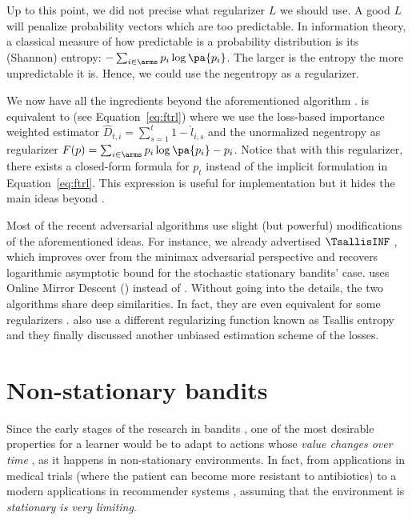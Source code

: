 {Up to this point, we did not precise what regularizer $L$ we should use. A good $L$ will penalize probability vectors which are too predictable. In information theory, a classical measure of how predictable is a probability distribution is its (Shannon) entropy: $- \sum_{i \in \arms} p_i \log\pa{p_i}$. The larger is the entropy the more unpredictable it is. Hence, we could use the negentropy as a regularizer. 

We now have all the ingredients beyond the aforementioned \EXP algorithm \citep{auer2002nonstochastic}. \EXP is equivalent to \FTRL (see Equation~\ref{eq:ftrl}) where we use the loss-based importance weighted estimator $\hat{D}_{t,i} = \sum_{s=1}^t 1 - \hat{l}_{i,s}$ and the unormalized negentropy as regularizer $F(p) = \sum_{i \in \arms} p_i \log\pa{p_i} - p_i$. Notice that with this regularizer, there exists a closed-form formula for $p_t$ instead of the implicit formulation in Equation~\ref{eq:ftrl}. This expression is useful for implementation but it hides the main ideas beyond \EXP.

Most of the recent adversarial algorithms use slight (but powerful) modifications of the aforementioned ideas. For instance, we already advertised $\TsallisINF$ \citep{zimmert2018tsallis}, which improves over \EXP from the minimax adversarial perspective and recovers logarithmic asymptotic bound for the stochastic stationary bandits' case. \TsallisINF uses Online Mirror Descent (\OMD) instead of \FTRL. Without going into the details, the two algorithms share deep similarities. In fact, they are even equivalent for some regularizers \citep{mcmahan2011ftrl}. \citet{zimmert2018tsallis} also use a different regularizing function known as Tsallis entropy \citep{tsallis1988possible} and they finally discussed another unbiased estimation scheme of the losses.

\section{Non-stationary bandits}
\label{sec:non-stationary}
Since the early stages of the research in bandits \citep{thompson1933likelihood,whittle1980multi}, one of the most desirable properties for a learner would be to adapt to actions whose \textit{value changes over time} \citep{whittle1988restless}, as it happens in non-stationary environments. In fact, from applications in medical trials (where the patient can become more resistant to antibiotics) to a modern applications in recommender systems \citep{chapelle2011empirical,traca2015regulating}, assuming that the environment is \textit{stationary is very limiting}. 

}
